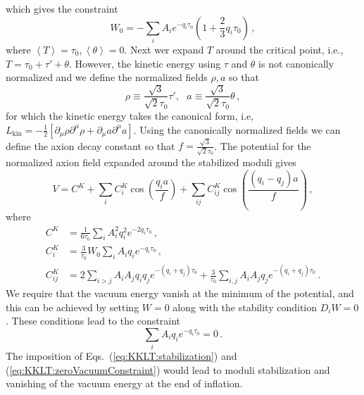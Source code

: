 \documentclass[12pt]{article}
\begin{document}
which gives the constraint
\begin{equation} \label{eq:KKLT:W0}
  W_0 = -\sum_i A_i e^{-q_i \tau_0} \left(1 + \frac{2}{3} q_i \tau_0\right)\,,
\end{equation}
where $\left<T\right> = \tau_0, \left<\theta\right> = 0$.
Next wer expand $T$ around the critical point, i.e., $T = \tau_0 + \tau' + \theta$.
However, the kinetic energy using $\tau$ and $\theta$ is not canonically normalized and we define the normalized fields $\rho, a$ so that
\begin{equation} \label{eq:KKLT:rho.a}
  \rho \equiv \frac{\sqrt 3}{\sqrt{2} \tau_0} \tau',
  ~~~ a \equiv \frac{\sqrt 3}{\sqrt{2} \tau_0} \theta\,,
\end{equation}
for which the kinetic energy takes the canonical form, i.e, $L_\text{kin} = -\frac{1}{2} \left[\partial_\mu \rho \partial^\mu \rho + \partial_\mu a \partial^\mu a\right]$.
Using the canonically normalized fields we can define the axion decay constant so that $f = \frac{\sqrt 3}{\sqrt{2} \tau_0}$.
The potential for the normalized axion field expanded around the stabilized moduli gives
\begin{equation} \label{eq:KKLT:Vslow}
  V = C^K
    + \sum_i C^K_i \cos\left(\frac{q_i a}{f}\right)
    + \sum_{ij} C^K_{ij} \cos\left(\frac{\left(q_i - q_j\right) a}{f}\right)\,,
\end{equation}
where
\begin{equation} \label{eq:KKLT:VslowCoefficients}
  \begin{aligned}
    C^K &= \frac{1}{6 \tau_0} \sum_i A^2_i q^2_i e^{-2 q_i \tau_0}\,,\\
    C^K_i &= \frac{3}{\tau_0} W_0 \sum_i A_i q_i e^{-q_i \tau_0}\,,\\
    C^K_{ij} &= 2 \sum_{i > j} A_i A_j q_i q_j e^{-\left(q_i + q_j\right) \tau_0}
      + \frac{3}{\tau_0} \sum_{i, j} A_i A_j q_j e^{-\left(q_i + q_j\right) \tau_0}\,.
  \end{aligned}
\end{equation}
We require that the vacuum energy vanish at the minimum of the potential, and this can be achieved by setting $W = 0$ along with the stability condition $D_i W = 0$.
These conditions lead to the constraint
\begin{equation} \label{eq:KKLT:zeroVacuumConstraint}
  \sum_i A_i q_i e^{-q_i \tau_0} = 0\,.
\end{equation}
The imposition of Eqs.~(\ref{eq:KKLT:stabilization}) and (\ref{eq:KKLT:zeroVacuumConstraint}) would lead to moduli stabilization and vanishing of the vacuum energy at the end of inflation.
\end{document}
